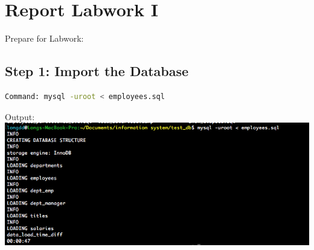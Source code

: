\documentclass[12pt]{report}
\begin{document}
\section*{Report Labwork I}

Prepare for Labwork:

{\small
{}}
{\small
{}}
{\small
{}}


\subsection*{Step 1: Import the Database}

\begin{lstlisting}[language=bash]
Command: mysql -uroot < employees.sql
\end{lstlisting}
Output:
\\
\includegraphics[width=0.8\paperwidth]{import_DB}
\\
\\
\\
\end{document}
